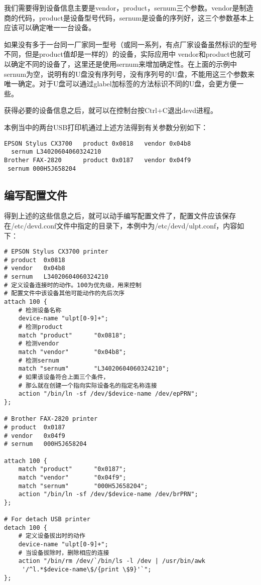 我们需要得到设备信息主要是vendor，product，sernum三个参数。vendor是制造商的代码，product是设备型号代码，sernum是设备的序列好，这三个参数基本上应该可以确定唯一一台设备。

如果没有多于一台同一厂家同一型号（或同一系列，有点厂家设备虽然标识的型号不同，但是product值却是一样的）的设备，实际应用中 vendor和product也就可以确定不同的设备了，这里还是使用sernum来增加确定性。在上面的示例中sernum为空，说明有的U盘没有序列号，没有序列号的U盘，不能用这三个参数来唯一确定。对于U盘可以通过glabel加标签的方法标识不同的U盘，会更方便一些。

获得必要的设备信息之后，就可以在控制台按Ctrl+C退出devd进程。

本例当中的两台USB打印机通过上述方法得到有关参数分别如下：
\begin{lstlisting}
EPSON Stylus CX3700   product 0x0818   vendor 0x04b8 
  sernum L34020604060324210
Brother FAX-2820      product 0x0187   vendor 0x04f9  
 sernum 000H5J658204
\end{lstlisting}

\subsection{编写配置文件}

得到上述的这些信息之后，就可以动手编写配置文件了，配置文件应该保存在/etc/devd.conf文件中指定的目录下，本例中为/etc/devd/ulpt.conf，内容如下：
\begin{lstlisting}
# EPSON Stylus CX3700 printer
# product  0x0818
# vendor   0x04b8
# sernum   L34020604060324210
# 定义设备连接时的动作。100为优先级，用来控制
# 配置文件中该设备其他可能动作的先后次序
attach 100 {                                              
	# 检测设备名称
	device-name "ulpt[0-9]+";
	# 检测product                           
	match "product"      "0x0818";
	# 检测vendor
	match "vendor"       "0x04b8";
	# 检测sernum
	match "sernum"       "L34020604060324210";
	# 如果该设备符合上面三个条件，
	# 那么就在创建一个指向实际设备名的指定名称连接
	action "/bin/ln -sf /dev/$device-name /dev/epPRN";   
};

# Brother FAX-2820 printer
# product  0x0187
# vendor   0x04f9
# sernum   000H5J658204

attach 100 {
	match "product"      "0x0187";
	match "vendor"       "0x04f9";
	match "sernum"       "000H5J658204";
	action "/bin/ln -sf /dev/$device-name /dev/brPRN";
};

# For detach USB printer
detach 100 {
	# 定义设备拔出时的动作
	device-name "ulpt[0-9]+";
	# 当设备拔除时，删除相应的连接
	action "/bin/rm /dev/`/bin/ls -l /dev | /usr/bin/awk
	 '/^l.*$device-name\$/{print \$9}'`";
};
\end{lstlisting}

